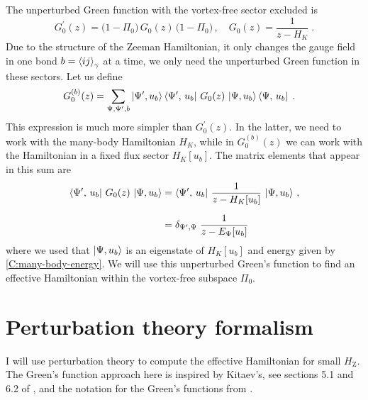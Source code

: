The unperturbed Green function with the vortex-free sector excluded is
\begin{equation}
    G_0^{\prime}(z) = \big( 1-\Pi_0\big) \, G_0(z) \, \big( 1-\Pi_0\big)  \, , \quad       G_0(z) = \frac{1}{z-H_{K}} \; .
\end{equation}
Due to the structure of the Zeeman Hamiltonian, it only changes the gauge field in one bond $b=\braket{ij}_\gamma$ at a time, we only need the unperturbed Green function in these sectors. Let us define
\begin{equation}
\begin{split}
    G_0^{(b)}(z)
    &= \sum_{\Psi,\Psi',b} \ket{\Psi',u_b} \bra{\Psi', \, u_b}   \, G_0(z) \,  \ket{\Psi,u_b} \bra{\Psi, \, u_b} \; . \label{C:G0b}
\end{split}
\end{equation}
This expression is much more simpler than $G_0^{\prime}(z)$. In the latter, we need to work with the many-body Hamiltonian $H_K$, while in $G_0^{(b)}(z)$ we can work with the Hamiltonian in a fixed flux sector $H_K[u_b]$.
The matrix elements that appear in this sum are
\begin{align}
    \bra{\Psi', \, u_b}   \, G_0(z) \,  \ket{\Psi,u_b}
    &=   \bra{\Psi', \, u_b}   \, \frac{1}{z-H_{K}[u_b] }\,  \ket{\Psi,u_b}   \, , \\[6pt]
    &= \delta_{\Psi',\Psi} \;    \frac{1}{z-E_\Psi[u_b] }\,   \label{C:G0}
\end{align}
where we used that $\ket{\Psi,u_b}$ is an eigenstate of $H_K[u_b]$ and energy given by \eqref{C:many-body-energy}.
We will use this unperturbed Green's function to find an effective Hamiltonian within the vortex-free subspace $\Pi_0$.



\section{Perturbation theory formalism}\label{sec:perturbation}


I will use perturbation theory to compute the effective Hamiltonian for small $H_\text{Z}$.  The Green's function approach here is inspired by Kitaev's, see sections 5.1 and 6.2 of \cite{Kitaev2006}, and the notation for the Green's functions from \cite{Bravyi_2011}.

